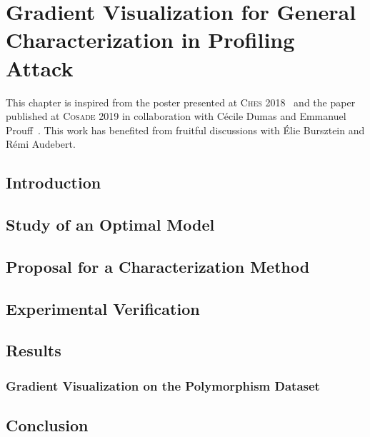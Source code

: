 \chapter{Gradient Visualization for General Characterization in Profiling Attack}
\label{chap:gradient_viz}
This chapter is inspired from the poster presented at \textsc{Ches} 2018~\cite{masure_understanding_2018} and the paper published at \textsc{Cosade} 2019 in collaboration with Cécile Dumas and Emmanuel Prouff~\cite{masure_gradient_2019}.
This work has benefited from fruitful discussions with Élie Bursztein and Rémi Audebert.
\minitoc
\newpage
\section{Introduction}
    \label{sec:intro_cosade}
    

\section{Study of an Optimal Model}
    \label{sec:optimal_model}
    

\section{Proposal for a Characterization Method}
    \label{sec:charac_propal}
    

\section{Experimental Verification}
    \label{sec:method_cosade}
    

\section{Results}
    \label{sec:exp_res_cosade}
    

\subsection{Gradient Visualization on the Polymorphism Dataset}
    \label{sec:gv_claps}
    

\section{Conclusion}
    
